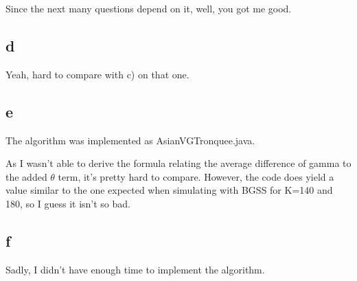 \documentclass[12pt]{report}
\begin{document}
Since the next many questions depend on it, well, you got me good.

\subsection*{d}

Yeah, hard to compare with c) on that one.

\subsection*{e}

The algorithm was implemented as AsianVGTronquee.java.

As I wasn't able to derive the formula relating the average difference of gamma to the added $\theta$ term, it's pretty hard to compare. However, the code does yield a value similar to the one expected when simulating with BGSS for K=140 and 180, so I guess it isn't so bad.


\subsection*{f}

Sadly, I didn't have enough time to implement the algorithm.





\end{document}
